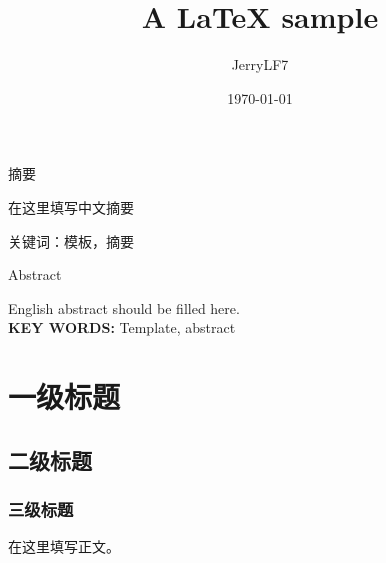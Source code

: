 \documentclass[12pt]{ctexrep}
\title{A \LaTeX{} sample}
\author{JerryLF7}
\date{\today}
\begin{document}
\sloppy %

\maketitle
\begin{center}
    \heiti 摘\hspace{1em}要
  \end{center}
  
  \vspace{1em}
  \begin{spacing}{1.5}
    \songti 
    在这里填写中文摘要
    
  \end{spacing}
  
  \vspace{1em}
  \begin{spacing}{1}
    \heiti 关键词：\songti 模板，摘要
  \end{spacing}
  

\newpage
\newfontfamily{}

\begin{center}
  \fontsize{16}{24}\selectfont\englishtitlefont Abstract
\end{center}

\vspace{1em}
\fontsize{12}{18}\selectfont
English abstract should be filled here.\\

\textbf{KEY WORDS:} Template, abstract



\newpage
\renewcommand{\contentsname}{\centering 目录} %
{\centering \tableofcontents}

\setcounter{page}{0}
\thispagestyle{empty}

\chapter{一级标题}
    \section{二级标题}
      \subsection{三级标题}
            在这里填写正文。
\end{document}
